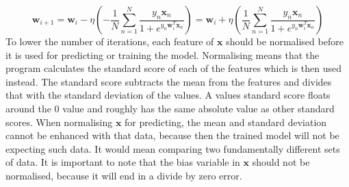 \[ \mathbf{w}_{i+1} = \mathbf{w}_i - \eta \left( -\frac{1}{N} \sum_{n=1}^N \frac{y_n \mathbf{x}_n}{1 + e^{y_n \mathbf{w}_i^T \mathbf{x}_n}} \right) = \mathbf{w}_i + \eta \left( \frac{1}{N} \sum_{n=1}^N \frac{y_n \mathbf{x}_n}{1 + e^{y_n \mathbf{w}_i^T \mathbf{x}_n}} \right) \]
To lower the number of iterations, each feature of $\mathbf{x}$ should be
normalised before it is used for predicting or training the model. Normalising
means that the program calculates the standard score of each of the features
which is then used instead. The standard score subtracts the mean from the
features and divides that with the standard deviation of the values. A values
standard score floats around the 0 value and roughly has the same absolute value
as other standard scores. When normalising $\mathbf{x}$ for predicting, the mean
and standard deviation cannot be enhanced with that data, because then the
trained model will not be expecting such data. It would mean comparing two
fundamentally different sets of data. It is important to note that the bias
variable in $\mathbf{x}$ should not be normalised, because it will end in a
divide by zero error.\cite{website:normalisation}
